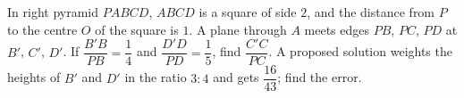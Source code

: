 In right pyramid $PABCD$, $ABCD$ is a square of side $2$, and the distance from $P$ to the centre $O$ of the square is $1$. A plane through $A$ meets edges $PB$, $PC$, $PD$ at $B'$, $C'$, $D'$. If $\dfrac{B'B}{PB}=\dfrac14$ and $\dfrac{D'D}{PD}=\dfrac15$, find $\dfrac{C'C}{PC}$. A proposed solution weights the heights of $B'$ and $D'$ in the ratio $3:4$ and gets $\dfrac{16}{43}$; find the error.

